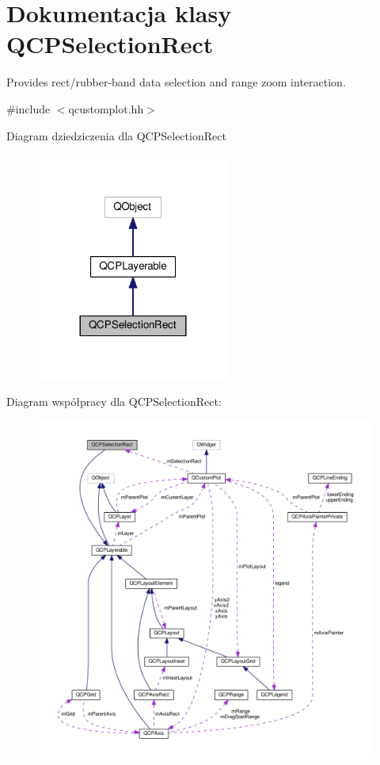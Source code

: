 \hypertarget{class_q_c_p_selection_rect}{}\section{Dokumentacja klasy Q\+C\+P\+Selection\+Rect}
\label{class_q_c_p_selection_rect}


Provides rect/rubber-\/band data selection and range zoom interaction.  




{\ttfamily \#include $<$qcustomplot.\+hh$>$}



Diagram dziedziczenia dla Q\+C\+P\+Selection\+Rect\nopagebreak
\begin{figure}[H]
\begin{center}
\leavevmode
\includegraphics[width=180pt]{class_q_c_p_selection_rect__inherit__graph}
\end{center}
\end{figure}


Diagram współpracy dla Q\+C\+P\+Selection\+Rect\+:\nopagebreak
\begin{figure}[H]
\begin{center}
\leavevmode
\includegraphics[width=350pt]{class_q_c_p_selection_rect__coll__graph}
\end{center}
\end{figure}
